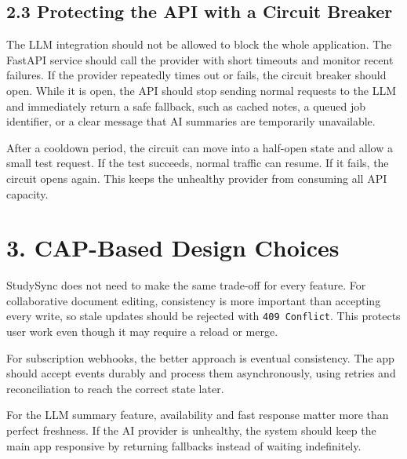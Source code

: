 \documentclass[10pt]{article}
\begin{document}
\subsection*{2.3 Protecting the API with a Circuit Breaker}

The LLM integration should not be allowed to block the whole application. The
FastAPI service should call the provider with short timeouts and monitor recent
failures. If the provider repeatedly times out or fails, the circuit breaker
should open. While it is open, the API should stop sending normal requests to the
LLM and immediately return a safe fallback, such as cached notes, a queued job
identifier, or a clear message that AI summaries are temporarily unavailable.

After a cooldown period, the circuit can move into a half-open state and allow a
small test request. If the test succeeds, normal traffic can resume. If it fails,
the circuit opens again. This keeps the unhealthy provider from consuming all API
capacity.

\section*{3. CAP-Based Design Choices}

StudySync does not need to make the same trade-off for every feature. For
collaborative document editing, consistency is more important than accepting
every write, so stale updates should be rejected with \texttt{409 Conflict}. This
protects user work even though it may require a reload or merge.

For subscription webhooks, the better approach is eventual consistency. The app
should accept events durably and process them asynchronously, using retries and
reconciliation to reach the correct state later.

For the LLM summary feature, availability and fast response matter more than
perfect freshness. If the AI provider is unhealthy, the system should keep the
main app responsive by returning fallbacks instead of waiting indefinitely.
\end{document}
